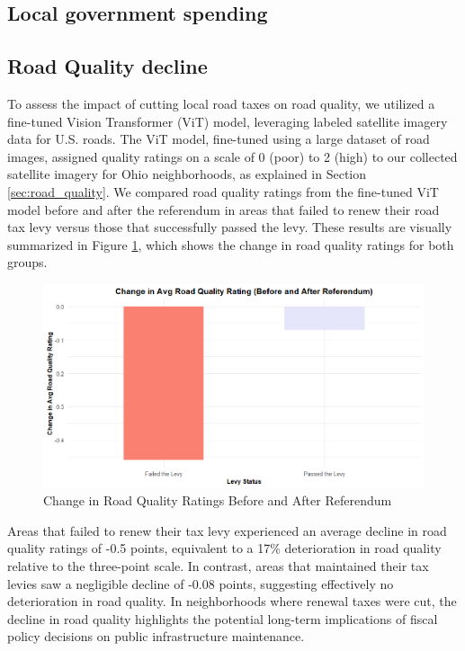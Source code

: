 
\subsection{Local government spending}



\subsection{Road Quality decline}

 To assess the impact of cutting local road taxes on road quality, we utilized a fine-tuned Vision Transformer (ViT) model, leveraging labeled satellite imagery data for U.S. roads. The ViT model, fine-tuned using a large dataset of road images, assigned quality ratings on a scale of 0 (poor) to 2 (high) to our collected satellite imagery for Ohio neighborhoods, as explained in Section \ref{sec:road_quality}. We compared road quality ratings from the fine-tuned ViT model before and after the referendum in areas that failed to renew their road tax levy versus those that successfully passed the levy. These results are visually summarized in Figure \ref{fig:road_quality_change}, which shows the change in road quality ratings for both groups. 


\begin{figure}[htbp]
    \centering
    \includegraphics[width=\textwidth,keepaspectratio]{images/road_quality_change.png}
    \caption{Change in Road Quality Ratings Before and After Referendum}
    \label{fig:road_quality_change}
\end{figure}

Areas that failed to renew their tax levy experienced an average decline in road quality ratings of -0.5 points, equivalent to a 17\% deterioration in road quality relative to the three-point scale. In contrast, areas that maintained their tax levies saw a negligible decline of -0.08 points, suggesting effectively no deterioration in road quality. In neighborhoods where renewal taxes were cut, the decline in road quality highlights the potential long-term implications of fiscal policy decisions on public infrastructure maintenance.

